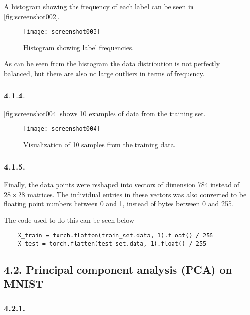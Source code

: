 \documentclass[a4paper, 12pt]{article}
\begin{document}
A histogram showing the frequency of each label can be seen in \autoref{fig:screenshot002}.

\begin{figure}[H]
	\centering
	\texttt{[image: screenshot003]}
	\caption{Histogram showing label frequencies.}
	\label{fig:screenshot002}
\end{figure}

As can be seen from the histogram the data distribution is not perfectly balanced, but there are also no large outliers in terms of frequency.

\subsubsection{4.1.4.}

\autoref{fig:screenshot004} shows 10 examples of data from the training set.

\begin{figure}[H]
	\centering
	\texttt{[image: screenshot004]}
	\caption{Visualization of 10 samples from the training data.}
	\label{fig:screenshot004}
\end{figure}

\subsubsection{4.1.5.}

Finally, the data points were reshaped into vectors of dimension 784 instead of $28 \times 28$ matrices.
The individual entries in these vectors was also converted to be floating point numbers between 0 and 1, instead of bytes between 0 and 255.

The code used to do this can be seen below:

\begin{verbatim}
	X_train = torch.flatten(train_set.data, 1).float() / 255
	X_test = torch.flatten(test_set.data, 1).float() / 255
\end{verbatim}


\subsection{4.2. Principal component analysis (PCA) on MNIST}

\subsubsection{4.2.1.}
\end{document}
